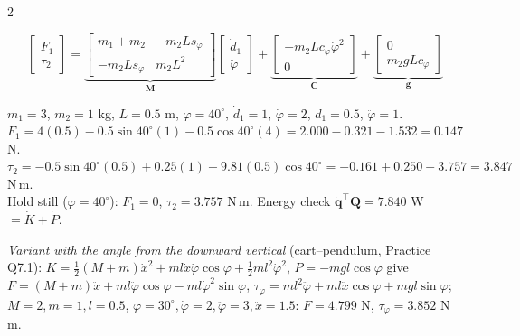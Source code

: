 \begin{multicols}{2}
\begin{fbx}
\[\begin{bmatrix}F_1\\\tau_2\end{bmatrix}=\underbrace{\begin{bmatrix}m_1+m_2&-m_2Ls_\varphi\\-m_2Ls_\varphi&m_2L^2\end{bmatrix}}_{\mathbf M}\begin{bmatrix}\ddot d_1\\\ddot\varphi\end{bmatrix}+\underbrace{\begin{bmatrix}-m_2Lc_\varphi\dot\varphi^2\\0\end{bmatrix}}_{\mathbf C}+\underbrace{\begin{bmatrix}0\\m_2gLc_\varphi\end{bmatrix}}_{\mathbf g}\]
\end{fbx}
\begin{worked}[numbers]
$m_1=3$, $m_2=1$ kg, $L=0.5$ m, $\varphi=40^\circ$, $\dot d_1=1$, $\dot\varphi=2$, $\ddot d_1=0.5$, $\ddot\varphi=1$.\\
$F_1=4(0.5)-0.5\sin40^\circ(1)-0.5\cos40^\circ(4)=2.000-0.321-1.532=\boxed{0.147}$ N.\\
$\tau_2=-0.5\sin40^\circ(0.5)+0.25(1)+9.81(0.5)\cos40^\circ=-0.161+0.250+3.757=\boxed{3.847}$ N\,m.\\
Hold still ($\varphi=40^\circ$): $F_1=0$, $\tau_2=3.757$ N\,m. Energy check $\dot{\mathbf q}^\top\mathbf Q=7.840$ W $=\dot K+\dot P$. \chk
\end{worked}
\textit{Variant with the angle from the downward vertical} (cart--pendulum, Practice Q7.1): $K=\tfrac12(M{+}m)\dot x^2+ml\dot x\dot\varphi\cos\varphi+\tfrac12ml^2\dot\varphi^2$, $P=-mgl\cos\varphi$ give $F=(M{+}m)\ddot x+ml\ddot\varphi\cos\varphi-ml\dot\varphi^2\sin\varphi$, $\tau_\varphi=ml^2\ddot\varphi+ml\ddot x\cos\varphi+mgl\sin\varphi$; $M=2,m=1,l=0.5$, $\varphi=30^\circ,\dot\varphi=2,\ddot\varphi=3,\ddot x=1.5$: $F=4.799$ N, $\tau_\varphi=3.852$ N\,m. \chk


\end{multicols}
